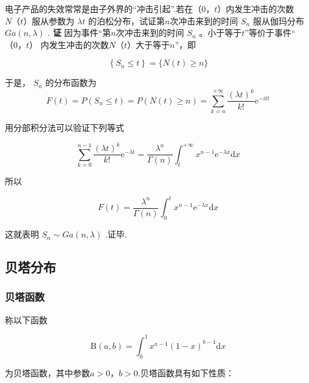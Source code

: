 \begin{example}
	电子产品的失效常常是由子外界的“冲击引起”.若在$ （0，t） $内发生冲击的次数$ N（t） $服从参数为 $\lambda t$ 的泊松分布，试证第$ n $次冲击来到的时间 $S_{n}$ 服从伽玛分布 $G a(n, \lambda)$ .
	\textbf{证} 因为事件“第$ n $次冲击来到的时间 $S_{n}$ 。小于等于$ t $”等价于事件“$ （0，t） $
	内发生冲击的次数$ N（t） $大于等于$ n $”，即
	
	\[
	\left\{S_{n} \leqslant t\right\}=\{N(t) \geqslant n\}
	\]
	
	于是， $S_{n}$ 的分布函数为
	\[
	F(t)=P\left(S_{n} \leqslant t\right)=P(N(t) \geqslant n)=\sum_{k=n}^{+\infty} \frac{(\lambda t)^{k}}{k !} \mathrm{e}^{-i t t}
	\]
	
	用分部积分法可以验证下列等式
	
	\begin{equation}
	\sum_{k=0}^{n-1} \frac{(\lambda t)^{k}}{k !} \mathrm{e}^{-\lambda t}=\frac{\lambda^{n}}{\Gamma(n)} \int_{t}^{+\infty} x^{n-1} \mathrm{e}^{-\lambda x} \mathrm{d} x \label{eq:2.5.16}
	\end{equation}
	
	所以
	
	\[
	F(t)=\frac{\lambda^{n}}{\Gamma(n)} \int_{0}^{t} x^{n-1} \mathrm{e}^{-\lambda x} \mathrm{d} x
	\]
	
	这就表明 $S_{n} \sim G a(n, \lambda)$ .证毕.
\end{example}

\subsection{贝塔分布}

\subsubsection{贝塔函数}

称以下函数

\begin{equation}
\mathrm{B}(a, b)=\int_{0}^{1} x^{a-1}(1-x)^{b-1} \mathrm{d} x \label{eq:2.5.17}
\end{equation}

为贝塔函数，其中参数$ a>0，b>0 $.贝塔函数具有如下性质：

